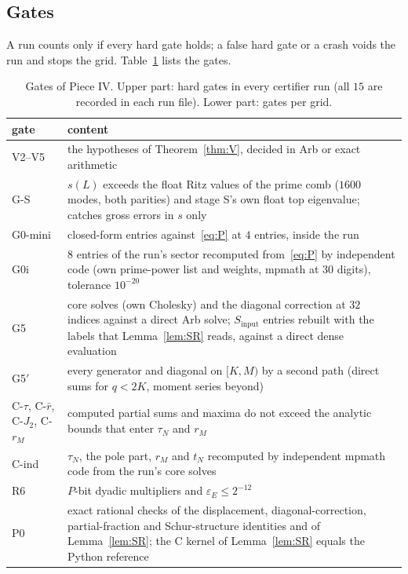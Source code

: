 \documentclass[11pt]{amsart}
\theoremstyle{definition}
\theoremstyle{remark}
\numberwithin{equation}{section}
\begin{document}
\subsection{Gates}\label{sec:piece4gates}
A run counts only if every hard gate holds; a false hard gate or a crash voids the run and stops the grid. Table~\ref{tab:gates} lists the gates.

\begin{table}[ht]
\centering\footnotesize
\caption{Gates of Piece IV. Upper part: hard gates in every certifier run (all $15$ are recorded in each run file). Lower part: gates per grid.}\label{tab:gates}
\begin{tabular}{>{\raggedright\arraybackslash}p{}>{\raggedright\arraybackslash}p{}}
\toprule
gate & content\\
\midrule
V2--V5 & the hypotheses of Theorem~\ref{thm:V}, decided in Arb or exact arithmetic\\
G-S & $s(L)$ exceeds the float Ritz values of the prime comb ($1600$ modes, both parities) and stage S's own float top eigenvalue; catches gross errors in $s$ only\\
G0-mini & closed-form entries against~\eqref{eq:P} at $4$ entries, inside the run\\
G0i & $8$ entries of the run's sector recomputed from~\eqref{eq:P} by independent code (own prime-power list and weights, mpmath at $30$ digits), tolerance $10^{-20}$\\
G5 & core solves (own Cholesky) and the diagonal correction at $32$ indices against a direct Arb solve; $S_{\mathrm{input}}$ entries rebuilt with the labels that Lemma~\ref{lem:SR} reads, against a direct dense evaluation\\
G5$'$ & every generator and diagonal on $[K,M)$ by a second path (direct sums for $q<2K$, moment series beyond)\\
C-$\tau$, C-$\bar r$, C-$J_2$, C-$r_M$ & computed partial sums and maxima do not exceed the analytic bounds that enter $\tau_N$ and $r_M$\\
C-ind & $\tau_N$, the pole part, $r_M$ and $t_N$ recomputed by independent mpmath code from the run's core solves\\
R6 & $P$-bit dyadic multipliers and $\varepsilon_E\le2^{-12}$\\
\midrule
P0 & exact rational checks of the displacement, diagonal-correction, partial-fraction and Schur-structure identities and of Lemma~\ref{lem:SR}; the C kernel of Lemma~\ref{lem:SR} equals the Python reference\\

\end{tabular}
\end{table}
\end{document}
